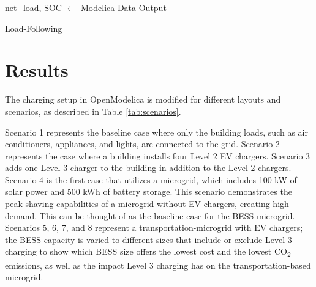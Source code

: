 \documentclass[conference]{IEEEtran}
\begin{document}
		\begin{algorithm}
			net\_load, SOC $\gets$ Modelica Data Output \\
			\caption{Load-Following}
			\label{alg:peakshavingflatrate}
		\end{algorithm}
\section{Results}
	The charging setup in OpenModelica is modified for different layouts and scenarios, as described in Table \ref{tab:scenarios}.
	
	Scenario 1 represents the baseline case where only the building loads, such as air conditioners, appliances, and lights, are connected to the grid. Scenario 2 represents the case where a building installs four Level 2 EV chargers. Scenario 3 adds one Level 3 charger to the building in addition to the Level 2 chargers. Scenario 4 is the first case that utilizes a microgrid, which includes 100 kW of solar power and 500 kWh of battery storage. This scenario demonstrates the peak-shaving capabilities of a microgrid without EV chargers, creating high demand. This can be thought of as the baseline case for the BESS microgrid. Scenarios 5, 6, 7, and 8 represent a transportation-microgrid with EV chargers; the BESS capacity is varied to different sizes that include or exclude Level 3 charging to show which BESS size offers the lowest cost and the lowest CO\textsubscript{2} emissions, as well as the impact Level 3 charging has on the transportation-based microgrid.
	
\end{document}
